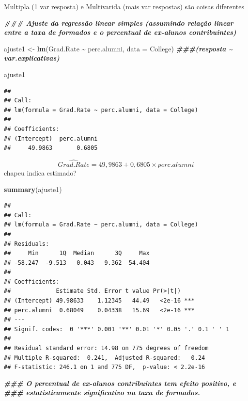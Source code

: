\documentclass[
]{article}
\newenvironment{Shaded}{\begin{snugshade}}{\end{snugshade}}
\newcommand{\AttributeTok}[1]{\textcolor[rgb]{0.13,0.29,0.53}{#1}}
\newcommand{\DocumentationTok}[1]{\textcolor[rgb]{0.56,0.35,0.01}{\textbf{\textit{#1}}}}
\newcommand{\FunctionTok}[1]{\textcolor[rgb]{0.13,0.29,0.53}{\textbf{#1}}}
\newcommand{\NormalTok}[1]{#1}
\newcommand{\OtherTok}[1]{\textcolor[rgb]{0.56,0.35,0.01}{#1}}
\newcommand{\SpecialCharTok}[1]{\textcolor[rgb]{0.81,0.36,0.00}{\textbf{#1}}}
\begin{document}
Multipla (1 var resposta) e Multivarida (mais var respostas) são coisas
diferentes

\begin{Shaded}
\begin{Highlighting}[]
\DocumentationTok{\#\#\# Ajuste da regressão linear simples (assumindo relação linear entre a taxa de formados e o percentual de ex{-}alunos contribuintes)}

\NormalTok{ajuste1 }\OtherTok{\textless{}{-}} \FunctionTok{lm}\NormalTok{(Grad.Rate }\SpecialCharTok{\textasciitilde{}}\NormalTok{ perc.alumni, }\AttributeTok{data =}\NormalTok{ College) }\DocumentationTok{\#\#\#(resposta \textasciitilde{} var.explicativas)}

\NormalTok{ajuste1}
\end{Highlighting}
\end{Shaded}

\begin{verbatim}
## 
## Call:
## lm(formula = Grad.Rate ~ perc.alumni, data = College)
## 
## Coefficients:
## (Intercept)  perc.alumni  
##     49.9863       0.6805
\end{verbatim}

\[
\hat{Grad.Rate} = 49,9863 + 0,6805 \times perc.alumni
\] chapeu indica estimado?

\begin{Shaded}
\begin{Highlighting}[]
\FunctionTok{summary}\NormalTok{(ajuste1)}
\end{Highlighting}
\end{Shaded}

\begin{verbatim}
## 
## Call:
## lm(formula = Grad.Rate ~ perc.alumni, data = College)
## 
## Residuals:
##     Min      1Q  Median      3Q     Max 
## -58.247  -9.513   0.043   9.362  54.404 
## 
## Coefficients:
##             Estimate Std. Error t value Pr(>|t|)    
## (Intercept) 49.98633    1.12345   44.49   <2e-16 ***
## perc.alumni  0.68049    0.04338   15.69   <2e-16 ***
## ---
## Signif. codes:  0 '***' 0.001 '**' 0.01 '*' 0.05 '.' 0.1 ' ' 1
## 
## Residual standard error: 14.98 on 775 degrees of freedom
## Multiple R-squared:  0.241,  Adjusted R-squared:   0.24 
## F-statistic: 246.1 on 1 and 775 DF,  p-value: < 2.2e-16
\end{verbatim}

\begin{Shaded}
\begin{Highlighting}[]
\DocumentationTok{\#\#\# O percentual de ex{-}alunos contribuintes tem efeito positivo, e }
\DocumentationTok{\#\#\# estatisticamente significativo na taxa de formados.}
\end{Highlighting}
\end{Shaded}
\end{document}
